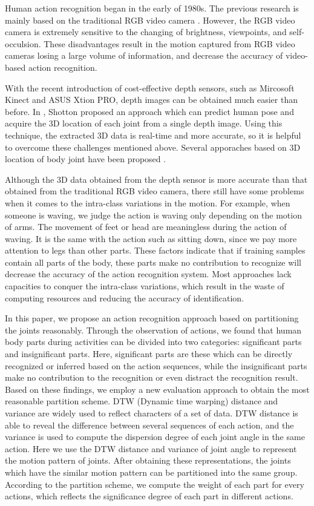 \documentclass[conference]{IEEEtran}
\begin{document}
Human action recognition began in the early of 1980s.
The previous research is mainly based on the traditional RGB video camera \cite{the_review_of_action_recognition_on_rgb_video_camera}.
However, the RGB video camera is extremely sensitive to the changing of brightness, viewpoints, and self-occulsion.
These disadvantages result in the motion captured from RGB video cameras losing a large volume of information, and decrease the accuracy of video-based action recognition.

With the recent introduction of cost-effective depth sensors, such as Mircosoft Kinect and ASUS Xtion PRO, depth images can be obtained much easier than before.
In \cite{pose_recognition_from_single_delth_images}, Shotton proposed an approach which can predict human pose and acquire the 3D location of each joint from a single depth image.
Using this technique, the extracted 3D data is real-time and more accurate, so it is helpful to overcome these challenges mentioned above.
Several apporaches based on 3D location of body joint have been proposed \cite{the_review_of_action_recognition}.

Although the 3D data obtained from the depth sensor is more accurate than that obtained from the traditional RGB video camera, there still have some problems when it comes to the intra-class variations in the motion.
For example, when someone is waving, we judge the action is waving only depending on the motion of arms.
The movement of feet or head are meaningless during the action of waving.
It is the same with the action such as sitting down, since we pay more attention to legs than other parts.
These factors indicate that if training samples contain all parts of the body, these parts make no contribution to recognize will decrease the accuracy of the action recognition system.
Most approaches lack capacities to conquer the intra-class variations, which result in the waste of computing resources and reducing the accuracy of identification.

In this paper, we propose an action recognition approach based on partitioning the joints reasonably.
Through the observation of actions, we found that human body parts during activities can be divided into two categories: significant parts and insignificant parts.
Here, significant parts are these which can be directly recognized or inferred based on the action sequences,
while the insignificant parts make no contribution to the recognition or even distract the recognition result.
Based on these findings, we employ a new evaluation approach to obtain the most reasonable partition scheme.
DTW \cite{introduction_on_dtw} (Dynamic time warping) distance and variance are widely used to reflect characters of a set of data.
DTW distance is able to reveal the difference between several sequences of each action,
and the variance is used to compute the dispersion degree of each joint angle in the same action.
Here we use the DTW distance and variance of joint angle to represent the motion pattern of joints.
After obtaining these representations, the joints which have the similar motion pattern can be partitioned into the same group.
According to the partition scheme, we compute the weight of each part for every actions, which reflects the significance degree of each part in different actions.
\end{document}
